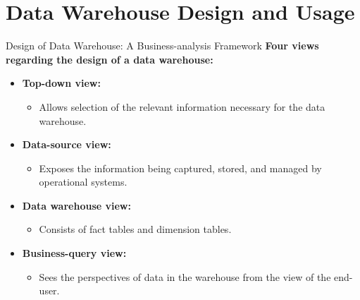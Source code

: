\section{Data Warehouse Design and Usage}

\begin{frame}{Design of Data Warehouse: A Business-analysis Framework}
	\textbf{Four views regarding the design of a data warehouse:}
	\begin{itemize}
		\item \textbf{\color{airforceblue}Top-down view:}
		      \begin{itemize}
			      \item Allows selection of the relevant information necessary for the data warehouse.
		      \end{itemize}
		\item \textbf{\color{airforceblue}Data-source view:}
		      \begin{itemize}
			      \item Exposes the information being captured, stored, and managed by operational systems.
		      \end{itemize}
		\item \textbf{\color{airforceblue}Data warehouse view:}
		      \begin{itemize}
			      \item Consists of fact tables and dimension tables.
		      \end{itemize}
		\item \textbf{\color{airforceblue}Business-query view:}
		      \begin{itemize}
			      \item Sees the perspectives of data in the warehouse from the view of the end-user.
		      \end{itemize}
	\end{itemize}
\end{frame}

